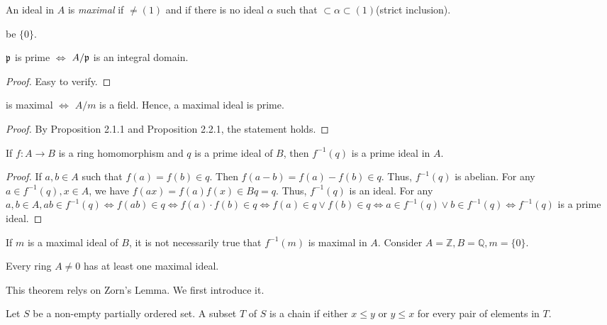 \documentclass[11pt,fleqn]{book} %
\begin{document}
\begin{CJK}{UTF8}{gkai}
\begin{definition}
	 An ideal \fm in $A$ is {\it maximal} if \fm $\neq (1)$ and if there is no ideal $\alpha $ such that \fm $\subset \alpha \subset (1)$(strict inclusion).
\end{definition}
\begin{remark}
	\fm {} be $\{0\}$.
\end{remark}

\begin{proposition}
	$\mathfrak{p}$ is prime $\iff$ $A/\mathfrak{p}$ is an integral domain.
\end{proposition}
\begin{proof}
	Easy to verify.
\end{proof}

\begin{proposition}
	\fm \text{ }is maximal $\iff$ $A/m$ is a field. Hence, a maximal ideal is prime.
\end{proposition}
\begin{proof}
	By Proposition 2.1.1 and Proposition 2.2.1, the statement holds.
\end{proof}

\begin{proposition}
	If $f: A\to B$ is a ring homomorphism and $q$ is a prime ideal of $B$, then $f^{-1}(q)$ is a prime ideal in $A$.
\end{proposition}
\begin{proof}
	If $a, b \in A$ such that $f(a) = f(b) \in q$. Then $f(a-b) = f(a)-f(b) \in q$. Thus, $f^{-1}(q)$ is abelian. For any $a \in f^{-1}(q), x \in A$, we have 
	$f(ax) = f(a)f(x) \in Bq = q$. Thus, $f^{-1}(q)$ is an ideal. For any $a, b\in A, ab \in f^{-1}(q) \iff f(ab) \in q \iff f(a)\cdot f(b)\in q \iff f(a) \in q \vee f(b) \in q \iff a \in f^{-1}(q) \vee b \in f^{-1}(q) \iff f^{-1}(q)$ is a prime ideal.  	
\end{proof}

\begin{remark}
	If $m$ is a maximal ideal of $B$, it is not necessarily true that $f^{-1}(m)$ is maximal in $A$. Consider $A = \mathbb{Z}, B = \mathbb{Q}, m = \{0\}$.
\end{remark}

\begin{theorem}
	Every ring $A \neq 0$ has at least one maximal ideal.
\end{theorem}
This theorem relys on Zorn's Lemma. We first introduce it.

\begin{definition}
	 Let $S$ be a non-empty partially ordered set. A subset $T$ of $S$ is a chain if either $x \leq y$ or $y \leq x$ for every pair of elements in $T$.
\end{definition}


\end{CJK}
\end{document}
